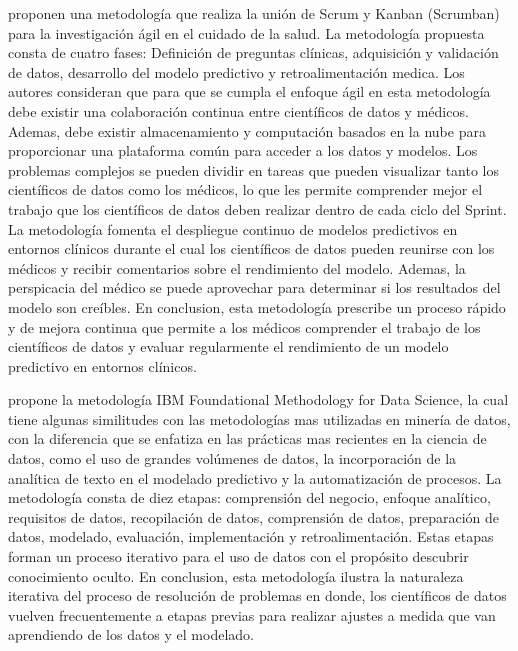 \cite{Lei2020} proponen una metodología que realiza la unión de Scrum y Kanban (Scrumban) para la investigación ágil en el cuidado de la salud. La metodología propuesta consta de cuatro fases: Definición de preguntas clínicas, adquisición y validación de datos, desarrollo del modelo predictivo y retroalimentación medica. Los autores consideran que para que se cumpla el enfoque ágil en esta metodología debe existir una colaboración continua entre científicos de datos y médicos. Ademas, debe existir almacenamiento y computación basados en la nube para proporcionar una plataforma común para acceder a los datos y modelos. Los problemas complejos se pueden dividir en tareas que pueden visualizar tanto los científicos de datos como los médicos, lo que les permite comprender mejor el trabajo que los científicos de datos deben realizar dentro de cada ciclo del Sprint. La metodología fomenta el despliegue continuo de modelos predictivos en entornos clínicos durante el cual los científicos de datos pueden reunirse con los médicos y recibir comentarios sobre el rendimiento del modelo. Ademas, la perspicacia del médico se puede aprovechar para determinar si los resultados del modelo son creíbles. En conclusion, esta metodología prescribe un proceso rápido y de mejora continua que permite a los médicos comprender el trabajo de los científicos de datos y evaluar regularmente el rendimiento de un modelo predictivo en entornos clínicos.

\cite{Rollins2015} propone la metodología IBM Foundational Methodology for Data Science, la cual tiene algunas similitudes con las metodologías mas utilizadas en minería de datos, con la diferencia que se enfatiza en las prácticas mas recientes en la ciencia de datos, como el uso de grandes volúmenes de datos, la incorporación de la analítica de texto en el modelado predictivo y la automatización de procesos. La metodología consta de diez etapas: comprensión del negocio, enfoque analítico, requisitos de datos, recopilación de datos, comprensión de datos, preparación de datos, modelado, evaluación, implementación y retroalimentación. Estas etapas  forman un proceso iterativo para el uso de datos con el propósito  descubrir conocimiento oculto. En conclusion, esta metodología ilustra la naturaleza iterativa del proceso de resolución de problemas en donde, los científicos de datos vuelven frecuentemente a etapas previas para realizar ajustes a medida que van aprendiendo de los datos y el modelado.  


